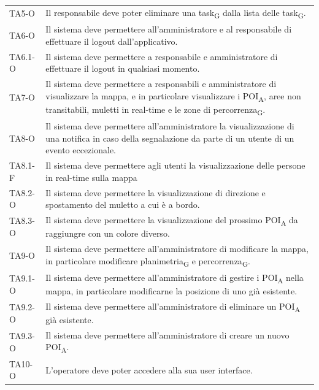 \begin{longtable}{ >{\centering}p{} >{}p{}}
	TA5-O & Il responsabile deve poter eliminare una task\textsubscript{G} dalla lista delle task\textsubscript{G}. \tabularnewline

	TA6-O & Il sistema deve permettere all'amministratore e al responsabile di effettuare il logout dall'applicativo.\tabularnewline
	TA6.1-O & Il sistema deve permettere a responsabile e amministratore di effettuare il logout in qualsiasi momento. \tabularnewline

	TA7-O & Il sistema deve permettere a responsabili e amministratore di visualizzare la mappa, e in particolare visualizzare i POI\textsubscript{A}, aree non transitabili, muletti in real-time e le zone di percorrenza\textsubscript{G}. \tabularnewline

	TA8-O & Il sistema deve permettere all'amministratore la visualizzazione di una notifica in caso della segnalazione da parte di un utente di un evento eccezionale.\tabularnewline

	TA8.1-F & Il sistema deve permettere agli utenti la visualizzazione delle persone in real-time sulla mappa\tabularnewline
	
	TA8.2-O & Il sistema deve permettere la visualizzazione di direzione e spostamento del muletto a cui è a bordo. \tabularnewline
	
	TA8.3-O & Il sistema deve permettere la visualizzazione del prossimo POI\textsubscript{A} da raggiungre con un colore diverso. \tabularnewline

	TA9-O & Il sistema deve permettere all'amministratore di modificare la mappa, in particolare modificare planimetria\textsubscript{G} e percorrenza\textsubscript{G}. \tabularnewline
	TA9.1-O & Il sistema deve permettere all'amministratore di gestire i POI\textsubscript{A} nella mappa, in particolare modificarne la posizione di uno già esistente. \tabularnewline
	TA9.2-O & Il sistema deve permettere all'amministratore di eliminare un POI\textsubscript{A} già esistente. \tabularnewline
	TA9.3-O & Il sistema deve permettere all'amministratore di creare un nuovo POI\textsubscript{A}. \tabularnewline

	TA10-O & L'operatore deve poter accedere alla sua user interface.\tabularnewline


\end{longtable}
